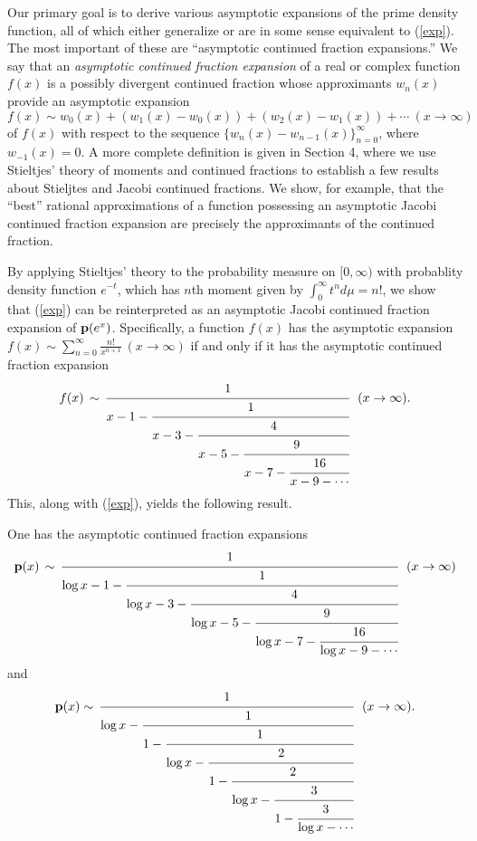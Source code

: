 \documentclass[12pt]{article}
\begin{document}
Our primary goal is to derive various asymptotic expansions of the prime density function, all of which either generalize or  are in some sense equivalent to  (\ref{exp}).  The most important  of these are ``asymptotic continued fraction expansions.''  We say that an {\it asymptotic continued fraction expansion} of a real or complex function $f(x)$ is a possibly divergent continued fraction whose approximants  $w_n(x)$ provide an asymptotic expansion
$$f(x) \sim w_0(x) + (w_1(x)-w_0(x)) + (w_2(x)-w_1(x)) + \cdots \ (x \to \infty)$$ of $f(x)$ with respect to the sequence $\{w_{n}(x)-w_{n-1}(x)\}_{n = 0}^\infty$, where $w_{-1}(x) = 0$.  A more complete definition is given in Section 4, where we use Stieltjes' theory of moments and continued fractions to establish a few results about Stieljtes and Jacobi continued fractions.   We show, for example, that the ``best'' rational approximations of a function possessing an asymptotic Jacobi  continued fraction expansion are precisely the approximants of the continued fraction.

By applying Stieltjes' theory to the probability measure on $[0,\infty)$ with probablity density function $e^{-t}$, which has $n$th moment given by $\int_0^\infty t^n d\mu  = n!$, we show that (\ref{exp}) can be reinterpreted as an asymptotic Jacobi continued fraction expansion of ${\mathbf p}(e^x)$.   Specifically, a function $f(x)$ has the asymptotic expansion $f(x) \sim \sum_{n = 0}^\infty \frac{n!}{x^{n+1}} \ (x \to \infty)$ if and only if it has the asymptotic continued fraction expansion 
$$f(x) \, \sim \, \cfrac{1}{x -1- \cfrac{1}{x-3-\cfrac{4}{x-5-\cfrac{9}{x-7-\cfrac{16}{x -9- \cdots}}}}} \ \ (x \to \infty).$$
This, along with (\ref{exp}), yields the following result.


\begin{theorem}\label{maincontthm1}
One has the asymptotic continued fraction expansions
$${\mathbf p}(x) \,  \sim \, \cfrac{1}{\log x-1-\cfrac{1}{\log x-3-\cfrac{4}{\log x-5-\cfrac{9}{\log x-7-\cfrac{16}{\log x-9-\cdots}}}}} \ \ (x \to \infty)$$
and
$${\mathbf p}(x) \sim \, \cfrac{1}{ \log x - \cfrac{1}{1-\cfrac{1}{\log x-\cfrac{2}{1-\cfrac{2}{\log x - \cfrac{3}{1-\cfrac{3}{\log x-\cdots}}}}}}} \ \ (x \to \infty).$$ 
\end{theorem}
\end{document}
